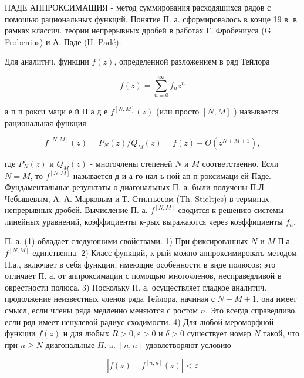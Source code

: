 \documentclass[10pt]{article}
\begin{document}
ПАДЕ АППРОКСИМАЩИЯ - метод суммирования расходяшихся рядов с помошью рациональных функций. Понятие П. а. сформировалось в конце 19 в. в рамках классич. теории непрерывных дробей в работах Г. Фробениуса (G. Frobenius) и А. Паде (Н. Padé).



Для аналитич. функции $f(z)$, определенной разложением в ряд Тейлора



\[

f(z)=\sum_{n=0}^{\infty} f_{n} z^{n}

\]



а п п рокси маци е й П а д е $f^{[N, M]}(z)$ (или просто $[N, M]$ ) называется рациональная функция



\[

f^{[N, M]}(z)=P_{N}(z) / Q_{M}(z)=f(z)+O\left(z^{N+M+1}\right),

\]



где $P_{N}(z)$ и $Q_{M}(z)$ - многочлены степеней $N$ и $M$ соответственно. Если $N=M$, то $f^{[N, M]}$ называется д и а го нал ь ной ап п роксимаци ей Паде. Фундаментальные результаты о диагональных П. а. были получены П.Л. Чебышевым, А. А. Марковым и Т. Стилтьесом (Th. Stieltjes) в терминах непрерывных дробей. Вычисление П. а. $f^{[N, M]}$ сводится к решению системы линейных уравнений, коэффициенты к-рых выражаются через коэффициенты $f_{n}$.



П. а. (1) обладает следуюшими свойствами. 1) При фиксированных $N$ и $M$ П.а. $f^{[N, M]}$ единственна. 2) Класс функций, к-рый можно аппроксимировать методом П.а., включает в себя функции, имеющие особенности в виде полюсов; это отличает П. а. от аппроксимации с помощью многочленов, несправедливой в окрестности полюса. 3) Поскольку П. а. осуществляет гладкое аналитич. продолжение неизвестных членов ряда Тейлора, начиная с $N+M+1$, она имеет смысл, если члены ряда медленно меняются с ростом $n$. Это всегда справедливо, если ряд имеет ненулевой радиус сходимости. 4) Для любой мероморфной функции $f(z)$ и для любых $R>0, \varepsilon>0$ и $\delta>0$ сушествует номер $N$ такой, что при $n \geqslant N$ диагональные $\Pi$. a. $[n, n]$ удовлетворяют условию



\[

\left|f(z)-f^{[n, n]}(z)\right|<\varepsilon

\]
\end{document}
